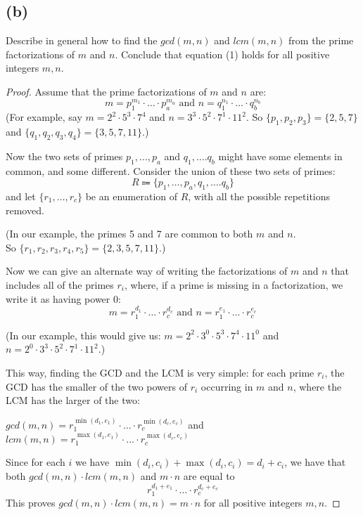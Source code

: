 \documentclass[14pt]{extarticle}
\begin{document}
\subsection{(b)}
Describe in general how to find the $gcd(m, n)$ and $lcm(m, n)$ from the prime factorizations of $m$ and $n$. Conclude that equation (1) holds for all positive integers $m, n$.
\begin{proof}
Assume that the prime factorizations of $m$ and $n$ are:
$$
m = p_1^{m_1} \cdot \ldots \cdot p_{a}^{m_a} \text{ and } n = q_1^{n_1} \cdot \ldots \cdot q_{b}^{n_b}
$$
(For example, say $m = 2^2 \cdot 5^3 \cdot 7^4$ and $n = 3^3 \cdot 5^2 \cdot 7^1 \cdot 11^2$. So $\{p_1, p_2, p_3\} = \{2, 5, 7\}$ and $\{q_1, q_2, q_3, q_4\} = \{3, 5, 7, 11\}.$)

Now the two sets of primes $p_1, \ldots, p_a$ and $q_1, \ldots. q_b$ might have some elements in common, and some different. Consider the union of these two sets of primes:
$$
R \Coloneqq \{p_1, \ldots, p_a, q_1, \ldots. q_b\}
$$
and let $\{r_1, \ldots, r_c\}$ be an enumeration of $R$, with all the possible repetitions removed.

(In our example, the primes 5 and 7 are common to both $m$ and $n$. \\ So $\{r_1, r_2, r_3, r_4, r_5\} = \{2, 3, 5, 7, 11\}$.)

Now we can give an alternate way of writing the factorizations of $m$ and $n$ that includes all of the primes $r_i$, where, if a prime is missing in a factorization, we write it as having power $0$:
$$
m = r_1^{d_1} \cdot \ldots \cdot r_c^{d_c} \text{ and } n = r_1^{e_1} \cdot \ldots \cdot r_c^{e_c}
$$

(In our example, this would give us: $m = 2^2 \cdot 3^0 \cdot 5^3 \cdot 7^4 \cdot 11^0$ and $n = 2^0 \cdot 3^3 \cdot 5^2 \cdot 7^1 \cdot 11^2$.)

This way, finding the GCD and the LCM is very simple: for each prime $r_i$, the GCD has the smaller of the two powers of $r_i$ occurring in $m$ and $n$, where the LCM has the larger of the two:

$gcd(m,n) = r_1^{\min(d_1, e_1)} \cdot \ldots \cdot r_c^{\min(d_c, e_c)}$ and $lcm(m,n) = r_1^{\max(d_1, e_1)} \cdot \ldots \cdot r_c^{\max(d_c, e_c)}$

Since for each $i$ we have $\min(d_i, c_i) + \max(d_i, c_i) = d_i + c_i$, we have that both $gcd(m,n) \cdot lcm(m,n)$ and $m \cdot n$ are equal to
$$
r_1^{d_1+ e_1} \cdot \ldots \cdot r_c^{d_c+ e_c}
$$
This proves $gcd(m,n) \cdot lcm(m,n) = m \cdot n$ for all positive integers $m,n$.
\end{proof}
\end{document}

